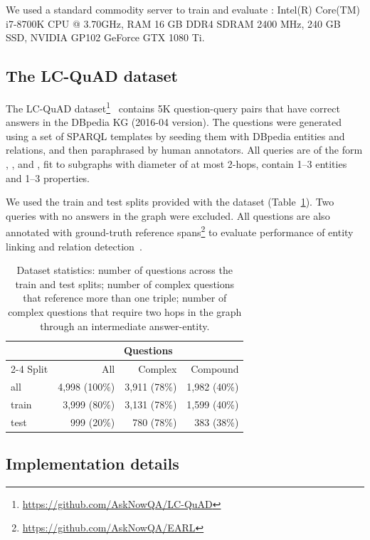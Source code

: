 We used a standard commodity server to train and evaluate \OurApproach{}: Intel(R) Core(TM) i7-8700K CPU @ 3.70GHz, RAM 16 GB DDR4 SDRAM 2400 MHz, 240 GB SSD, NVIDIA GP102 GeForce GTX 1080 Ti.

\subsection{The LC-QuAD dataset}
\label{sec:dataset}
The LC-QuAD dataset\footnote{\url{https://github.com/AskNowQA/LC-QuAD}}~\cite{DBLP:conf/semweb/TrivediMDL17} contains 5K question-query pairs that have correct answers in the DBpedia KG (2016-04 version).
The questions were generated using a set of SPARQL templates by seeding them with DBpedia entities and relations, and then paraphrased by human annotators.
All queries are of the form , , and , fit to subgraphs with diameter of at most 2-hops, contain 1--3 entities and 1--3 properties.

We used the train and test splits provided with the dataset (Table~\ref{tab:dataset}).
Two queries with no answers in the graph were excluded.
All questions are also annotated with ground-truth reference spans\footnote{\url{https://github.com/AskNowQA/EARL}} to evaluate performance of entity linking and relation detection~\cite{DBLP:conf/semweb/DubeyBCL18}.

\begin{table}
\centering
\caption{Dataset statistics: number of questions across the train and test splits; number of complex questions that reference more than one triple; number of complex questions that require two hops in the graph through an intermediate answer-entity.}
\label{tab:dataset}
\begin{tabular}{lrrr}
\toprule
 & \multicolumn{3}{c}{Questions} \\
\cmidrule{2-4}
Split & All & Complex & Compound  \\
\midrule
all  & 4,998 (100\%)       &     3,911 (78\%)       & 1,982 (40\%)           \\
train  & 3,999 \phantom{0}(80\%)       &      3,131 (78\%)           & 1,599 (40\%)          \\
test   & 999 \phantom{0}(20\%)        &       780 (78\%)          & 383 (38\%)         \\
\bottomrule
\end{tabular}
\end{table}

\subsection{Implementation details}
\label{sec:implementation}

